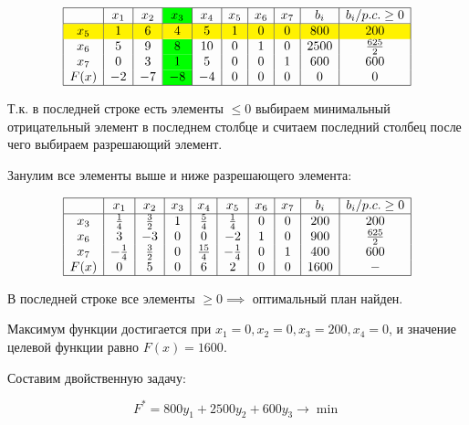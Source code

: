 \documentclass{article}
\begin{document}
\[
    \begin{array}{|c|c|c|>{\columncolor{green}}c|c|c|c|c|c|c|}
        \hline
             & x_1 & x_2 & x_3 & x_4 & x_5 & x_6 & x_7 & b_i  & b_i/p.c. \geq 0 \\
        \hline
        \rowcolor{yellow}
        x_5  & 1   & 6   & 4   & 5   & 1   & 0   & 0   & 800  & 200             \\
        x_6  & 5   & 9   & 8   & 10  & 0   & 1   & 0   & 2500 & \frac{625}{2}   \\
        x_7  & 0   & 3   & 1   & 5   & 0   & 0   & 1   & 600  & 600             \\
        F(x) & -2  & -7  & -8  & -4  & 0   & 0   & 0   & 0    & 0               \\
        \hline
    \end{array}
\]

Т.к. в последней строке есть элементы  \(\leq 0\) выбираем минимальный отрицательный элемент в последнем столбце и считаем последний столбец после чего выбираем разрешающий элемент.

Занулим все элементы выше и ниже разрешающего элемента:

\[
    \begin{array}{|c|c|c|c|c|c|c|c|c|c|}
        \hline
             & x_1          & x_2         & x_3 & x_4          & x_5          & x_6 & x_7 & b_i  & b_i/p.c. \geq 0 \\
        \hline
        x_3  & \frac{1}{4}  & \frac{3}{2} & 1   & \frac{5}{4}  & \frac{1}{4}  & 0   & 0   & 200  & 200             \\
        x_6  & 3            & -3          & 0   & 0            & -2           & 1   & 0   & 900  & \frac{625}{2}   \\
        x_7  & -\frac{1}{4} & \frac{3}{2} & 0   & \frac{15}{4} & -\frac{1}{4} & 0   & 1   & 400  & 600             \\
        F(x) & 0            & 5           & 0   & 6            & 2            & 0   & 0   & 1600 & -               \\
        \hline
    \end{array}
\]

В последней строке все элементы \(\geq 0 \implies\) оптимальный план найден.

Максимум функции достигается при \(x_1 = 0, x_2 = 0, x_3 = 200, x_4 = 0\), и значение целевой функции равно \(F(x) =1600\).

Составим двойственную задачу:

\[
    F^* = 800y_1 + 2500y_2 + 600y_3 \to \min
\]
\end{document}
